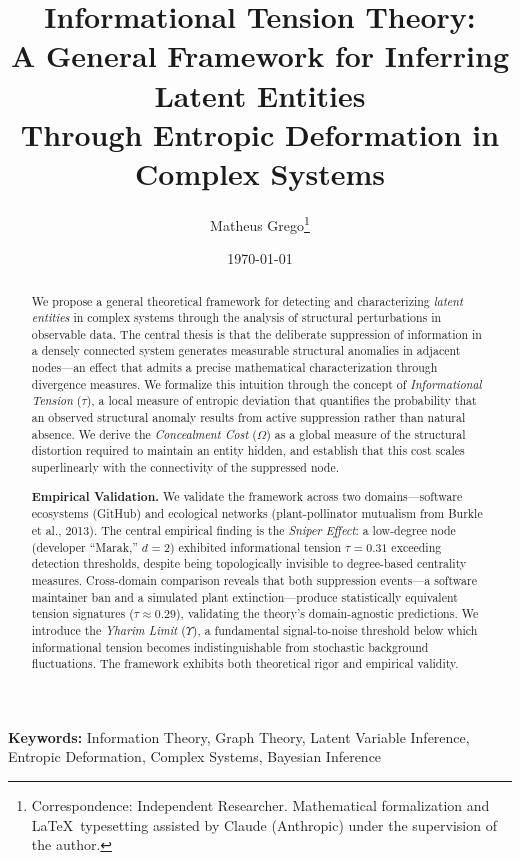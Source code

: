 \documentclass[12pt,a4paper]{article}
\title{
    \textbf{Informational Tension Theory:} \\
    \Large A General Framework for Inferring Latent Entities \\
    Through Entropic Deformation in Complex Systems
}
\author{
    Matheus Grego\footnote{Correspondence: Independent Researcher. Mathematical formalization and \LaTeX\ typesetting assisted by Claude (Anthropic) under the supervision of the author.}
}
\date{\today}
\theoremstyle{definition}
\theoremstyle{remark}
\newcommand{\Yharim}{\Upsilon}           %
\begin{document}
\maketitle

\begin{abstract}
We propose a general theoretical framework for detecting and characterizing \emph{latent entities} in complex systems through the analysis of structural perturbations in observable data. The central thesis is that the deliberate suppression of information in a densely connected system generates measurable structural anomalies in adjacent nodes---an effect that admits a precise mathematical characterization through divergence measures. We formalize this intuition through the concept of \emph{Informational Tension} ($\tau$), a local measure of entropic deviation that quantifies the probability that an observed structural anomaly results from active suppression rather than natural absence. We derive the \emph{Concealment Cost} ($\Omega$) as a global measure of the structural distortion required to maintain an entity hidden, and establish that this cost scales superlinearly with the connectivity of the suppressed node.

\textbf{Empirical Validation.} We validate the framework across two domains---software ecosystems (GitHub) and ecological networks (plant-pollinator mutualism from Burkle et al., 2013). The central empirical finding is the \emph{Sniper Effect}: a low-degree node (developer ``Marak,'' $d=2$) exhibited informational tension $\tau = 0.31$ exceeding detection thresholds, despite being topologically invisible to degree-based centrality measures. Cross-domain comparison reveals that both suppression events---a software maintainer ban and a simulated plant extinction---produce statistically equivalent tension signatures ($\tau \approx 0.29$), validating the theory's domain-agnostic predictions. We introduce the \emph{Yharim Limit} ($\Yharim$), a fundamental signal-to-noise threshold below which informational tension becomes indistinguishable from stochastic background fluctuations. The framework exhibits both theoretical rigor and empirical validity.
\end{abstract}

\vspace{1em}
\noindent\textbf{Keywords:} Information Theory, Graph Theory, Latent Variable Inference, Entropic Deformation, Complex Systems, Bayesian Inference

\newpage
\tableofcontents
\newpage
\end{document}
